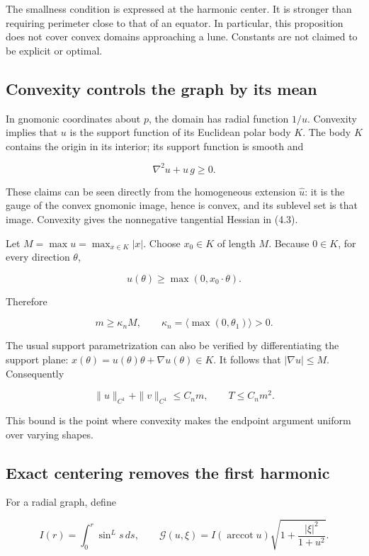 \documentclass[11pt]{article}
\begin{document}
The smallness condition is expressed at the harmonic center. It is
stronger than requiring perimeter close to that of an equator. In
particular, this proposition does not cover convex domains approaching a
lune. Constants are not claimed to be explicit or optimal.

\subsection{Convexity controls the graph by its
mean}\label{convexity-controls-the-graph-by-its-mean}

In gnomonic coordinates about \(p\), the domain has radial function
\(1/u\). Convexity implies that \(u\) is the support function of its
Euclidean polar body \(K\). The body \(K\) contains the origin in its
interior; its support function is smooth and

\[
\nabla^2u+u\,g\geq0.
\tag{4.3}
\]

These claims can be seen directly from the homogeneous extension
\(\widehat u\): it is the gauge of the convex gnomonic image, hence is
convex, and its sublevel set is that image. Convexity gives the
nonnegative tangential Hessian in (4.3).

Let \(M=\max u=\max_{x\in K}|x|\). Choose \(x_0\in K\) of length \(M\).
Because \(0\in K\), for every direction \(\theta\),

\[
u(\theta)\geq\max(0,x_0\cdot\theta).
\tag{4.4}
\]

Therefore

\[
m\geq \kappa_n M,\qquad
\kappa_n=\langle\max(0,\theta_1)\rangle>0.
\tag{4.5}
\]

The usual support parametrization can also be verified by
differentiating the support plane:
\(x(\theta)=u(\theta)\theta+\nabla u(\theta)\in K\). It follows that
\(|\nabla u|\leq M\). Consequently

\[
\|u\|_{C^1}+\|v\|_{C^1}\leq C_n m,\qquad
T\leq C_n m^2.
\tag{4.6}
\]

This bound is the point where convexity makes the endpoint argument
uniform over varying shapes.

\subsection{Exact centering removes the first
harmonic}\label{exact-centering-removes-the-first-harmonic}

For a radial graph, define

\[
I(r)=\int_0^r\sin^Ls\,ds,\qquad
\mathcal G(u,\xi)=I(\operatorname{arccot}u)
\sqrt{1+\frac{|\xi|^2}{1+u^2}}.
\tag{4.7}
\]
\end{document}
